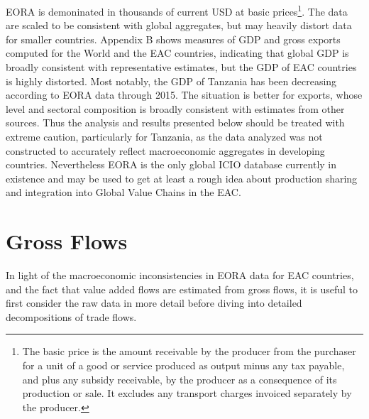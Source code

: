 \documentclass[a4paper]{article}
\begin{document}
 EORA is demoninated in thousands of current USD at basic prices\footnote{The basic price is the amount receivable by the producer from the purchaser for a unit of a good or service produced as output minus any tax payable, and plus any subsidy receivable, by the producer as a consequence of its production or sale. It excludes any transport charges invoiced separately by the producer.}. The data are scaled to be consistent with global aggregates, but may heavily distort data for smaller countries. Appendix B shows measures of GDP and gross exports computed for the World and the EAC countries, indicating that global GDP is broadly consistent with representative estimates, but the GDP of EAC countries is highly distorted. Most notably, the GDP of Tanzania has been decreasing according to EORA data through 2015. The situation is better for exports, whose level and sectoral composition is broadly consistent with estimates from other sources. Thus the analysis and results presented below should be treated with extreme caution, particularly for Tanzania, as the data analyzed was not constructed to accurately reflect macroeconomic aggregates in developing countries. Nevertheless EORA is the only global ICIO database currently in existence and may be used to get at least a rough idea about production sharing and integration into Global Value Chains in the EAC. %



\newpage





\section{Gross Flows}
In light of the macroeconomic inconsistencies in EORA data for EAC countries, and the fact that value added flows are estimated from gross flows, it is useful to first consider the raw data in more detail before diving into detailed decompositions of trade flows. \newline
\end{document}
